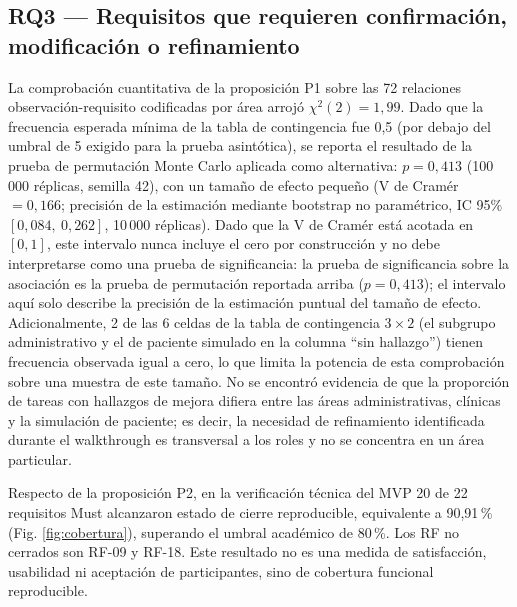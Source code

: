 \documentclass[runningheads]{llncs}
\begin{document}
	\subsection{RQ3 --- Requisitos que requieren confirmación, modificación o refinamiento}
	La comprobación cuantitativa de la proposición P1 sobre las 72 relaciones observación-requisito codificadas por área arrojó $\chi^2(2)=1{,}99$. Dado que la frecuencia esperada mínima de la tabla de contingencia fue 0,5 (por debajo del umbral de 5 exigido para la prueba asintótica), se reporta el resultado de la prueba de permutación Monte Carlo aplicada como alternativa: $p=0{,}413$ (100\,000 réplicas, semilla 42), con un tamaño de efecto pequeño (V de Cramér $=0{,}166$; precisión de la estimación mediante bootstrap no paramétrico, IC 95\% $[0{,}084,\ 0{,}262]$, 10\,000 réplicas). Dado que la V de Cramér está acotada en $[0,1]$, este intervalo nunca incluye el cero por construcción y no debe interpretarse como una prueba de significancia: la prueba de significancia sobre la asociación es la prueba de permutación reportada arriba ($p=0{,}413$); el intervalo aquí solo describe la precisión de la estimación puntual del tamaño de efecto. Adicionalmente, 2 de las 6 celdas de la tabla de contingencia $3\times2$ (el subgrupo administrativo y el de paciente simulado en la columna ``sin hallazgo'') tienen frecuencia observada igual a cero, lo que limita la potencia de esta comprobación sobre una muestra de este tamaño. No se encontró evidencia de que la proporción de tareas con hallazgos de mejora difiera entre las áreas administrativas, clínicas y la simulación de paciente; es decir, la necesidad de refinamiento identificada durante el walkthrough es transversal a los roles y no se concentra en un área particular.
	
	Respecto de la proposición P2, en la verificación técnica del MVP 20 de 22 requisitos Must alcanzaron estado de cierre reproducible, equivalente a 90,91\,\% (Fig. \ref{fig:cobertura}), superando el umbral académico de 80\,\%. Los RF no cerrados son RF-09 y RF-18. Este resultado no es una medida de satisfacción, usabilidad ni aceptación de participantes, sino de cobertura funcional reproducible.
	
\end{document}
